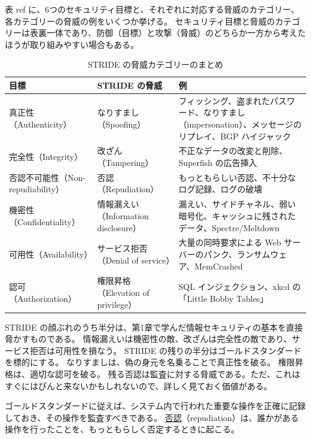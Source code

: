 \documentclass[uplatex]{jsarticle}
\def\ref#1{ref}%
\def\label#1{}%
\begin{document}
表 \ref{tab:ch2-stride} に、6つのセキュリティ目標と、それぞれに対応する脅威のカテゴリー、各カテゴリーの脅威の例をいくつか挙げる。
セキュリティ目標と脅威のカテゴリーは表裏一体であり、防御（目標）と攻撃（脅威）のどちらか一方から考えたほうが取り組みやすい場合もある。

\begin{table}[H]
\centering
\caption{STRIDE の脅威カテゴリーのまとめ}\label{tab:ch2-stride}
\small
\begin{tabularx}{\linewidth}{|l|l|X|}
\hline
目標 & STRIDE の脅威 & 例 \\
\hline
真正性（Authenticity） & なりすまし（Spoofing） & フィッシング、盗まれたパスワード、なりすまし（impersonation）、メッセージのリプレイ、BGP ハイジャック \\
\hline
完全性（Integrity） & 改ざん（Tampering） & 不正なデータの改変と削除、Superfish の広告挿入 \\
\hline
否認不可能性（Non-repudiability） & 否認（Repudiation） & もっともらしい否認、不十分なログ記録、ログの破壊 \\
\hline
機密性（Confidentiality） & 情報漏えい（Information disclosure） & 漏えい、サイドチャネル、弱い暗号化、キャッシュに残されたデータ、Spectre/Meltdown \\
\hline
可用性（Availability） & サービス拒否（Denial of service） & 大量の同時要求による Web サーバーのパンク、ランサムウェア、MemCrashed \\
\hline
認可（Authorization） & 権限昇格（Elevation of privilege） & SQL インジェクション、xkcd の「Little Bobby Tables」 \\
\hline
\end{tabularx}
\end{table}

STRIDE の顔ぶれのうち半分は、第1章で学んだ情報セキュリティの基本を直接脅かすものである。
情報漏えいは機密性の敵、改ざんは完全性の敵であり、サービス拒否は可用性を損なう。
STRIDE の残りの半分はゴールドスタンダードを標的にする。
なりすましは、偽の身元を名乗ることで真正性を破る。
権限昇格は、適切な認可を破る。
残る否認は監査に対する脅威である。ただ、これはすぐにはぴんと来ないかもしれないので、詳しく見ておく価値がある。

ゴールドスタンダードに従えば、システム内で行われた重要な操作を正確に記録しておき、その操作を監査すべきである。
\underline{否認}（repudiation）は、誰かがある操作を行ったことを、もっともらしく否定するときに起こる。
\end{document}
